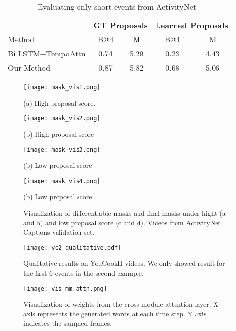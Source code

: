 \documentclass[10pt,twocolumn,letterpaper]{article}
\begin{document}
\begin{table}[t]
\centering
\caption{Evaluating only short events from ActivityNet.}
\label{tbl:short_events_only}
    {\small
\begin{tabular}{lcccc}
\toprule
& \multicolumn{2}{c}{\textbf{GT Proposals}} & \multicolumn{2}{c}{\textbf{Learned Proposals}} \\
Method & B@4 & M & B@4 & M \\
\midrule
Bi-LSTM+TempoAttn & 0.74 & 5.29 & 0.23 & 4.43 \\
\midrule
Our Method & 0.87 & 5.82 & 0.68 & 5.06 \\ 
\bottomrule
\end{tabular}
    }
\end{table}


\begin{figure*}
\centering
\begin{minipage}{0.7\linewidth}
  \centerline{\texttt{[image: mask\_vis1.png]}}
  \centerline{\small{(a) High proposal score.}}
\end{minipage}
\vfill
\begin{minipage}{0.7\linewidth}
  \centerline{\texttt{[image: mask\_vis2.png]}}
  \centerline{\small{(b) High proposal score}}
\end{minipage}
\vfill
\begin{minipage}{0.7\linewidth}
  \centerline{\texttt{[image: mask\_vis3.png]}}
  \centerline{\small{(b) Low proposal score}}
\end{minipage}
\vfill
\begin{minipage}{0.7\linewidth}
  \centerline{\texttt{[image: mask\_vis4.png]}}
  \centerline{\small{(b) Low proposal score}}
\end{minipage}
\caption{Visualization of differentiable masks and final masks under hight (a and b) and low proposal score (c and d). Videos from ActivityNet Captions validation set.} \label{fig:vis_mask}
\end{figure*}

\begin{figure*}[t]
\centering 
  \texttt{[image: yc2\_qualitative.pdf]}
\caption{Qualitative results on YouCookII videos. We only showed result for the first 6 events in the second example.}
\label{fig:yc2_qual}
\end{figure*}


\begin{figure}[t]
\centering 
  \texttt{[image: vis\_mm\_attn.png]}
\caption{Visualization of weights from the cross-module attention layer. X axis represents the generated words at each time step. Y axis indicates the sampled frames.}
\label{fig:vis_mm_attn}
\end{figure}
\end{document}
